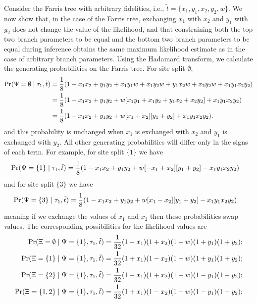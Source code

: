 Consider the Farris tree with arbitrary fidelities, i.e., $\tilde{t}=\{x_1,y_1,x_2,y_2,w\}$.
We now show that, in the case of the Farris tree, exchanging $x_1$ with $x_2$ and $y_1$ with $y_2$ does not change the value of the likelihood, and that constraining both the top two branch parameters to be equal and the bottom two branch parameters to be equal during inference obtains the same maximum likelihood estimate as in the case of arbitrary branch parameters.
Using the Hadamard transform, we calculate the generating probabilities on the Farris tree.
For site split $\emptyset$,
\begin{align*}
    \Pr(\Psi=\emptyset\mid \tau_1, \tilde{t}) & = \frac{1}{8} (1 + x_1x_2 +  y_1y_2 +  x_1y_1w + x_1y_2w + y_1x_2w + x_2y_2w + x_1y_1x_2y_2) \\
                                              & = \frac{1}{8} (1 + x_1x_2 +  y_1y_2 +  w[x_1y_1 + x_1y_2 + y_1x_2 + x_2y_2] + x_1y_1x_2y_2) \\
                                              & = \frac{1}{8} (1 + x_1x_2 +  y_1y_2 +  w[x_1 + x_2][y_1 + y_2] + x_1y_1x_2y_2).
\end{align*}
and this probability is unchanged when $x_1$ is exchanged with $x_2$ and $y_1$ is exchanged with $y_2$.
All other generating probabilities will differ only in the signs of each term.
For example, for site split $\{1\}$ we have
\begin{align*}
    \Pr(\Psi=\{1\}\mid \tau_1, \tilde{t}) & = \frac{1}{8} (1 - x_1x_2 +  y_1y_2 +  w[-x_1 + x_2][y_1 + y_2] - x_1y_1x_2y_2)
\end{align*}
and for site split $\{3\}$ we have
\begin{align*}
    \Pr(\Psi=\{3\}\mid \tau_1, \tilde{t}) & = \frac{1}{8} (1 - x_1x_2 +  y_1y_2 +  w[x_1 - x_2][y_1 + y_2] - x_1y_1x_2y_2)
\end{align*}
meaning if we exchange the values of $x_1$ and $x_2$ then these probabilities swap values.
The corresponding possibilities for the likelihood values are
\begin{align*}
    \Pr(\Xi=\emptyset \mid \Psi=\{1\}, \tau_1, \tilde{t}) &= \frac{1}{32}(1-x_1)(1+x_2)(1+w)(1+y_1)(1+y_2); \\
    \Pr(\Xi=\{1\} \mid \Psi=\{1\}, \tau_1, \tilde{t}) &= \frac{1}{32}(1+x_1)(1-x_2)(1-w)(1+y_1)(1+y_2); \\
    \Pr(\Xi=\{2\} \mid \Psi=\{1\}, \tau_1, \tilde{t}) &= \frac{1}{32}(1-x_1)(1+x_2)(1-w)(1-y_1)(1-y_2); \\
    \Pr(\Xi=\{1,2\} \mid \Psi=\{1\}, \tau_1, \tilde{t}) &= \frac{1}{32}(1+x_1)(1-x_2)(1+w)(1-y_1)(1-y_2);
\end{align*}

